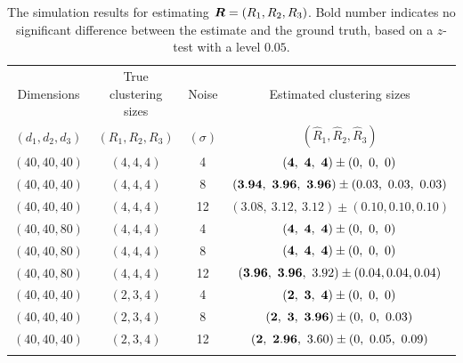 \documentclass{article}
\begin{document}
\begin{appendices}
\begin{table}[http]
	\begin{tabular}{c|c|c|c}
		\hline
		Dimensions &True clustering sizes&Noise&Estimated clustering sizes\\ 
$(d_1,d_2,d_3)$&$(R_1,R_2,R_3)$&$(\sigma)$&$(\hat R_1,\hat R_2,\hat R_3)$\\
		\hline
		$(40,40,40)$&$(4,4,4)$&4&$({\bf 4},\ {\bf 4},\ {\bf 4})\pm (0,\ 0,\ 0)$\\
		$(40,40,40)$&$(4,4,4)$&8&$({\bf 3.94},\ {\bf 3.96},\ {\bf 3.96})\pm (0.03,\ 0.03,\ 0.03)$\\
		$(40,40,40)$&$(4,4,4)$&12&$(3.08,\ 3.12,\ 3.12)\pm (0.10,0.10,0.10)$\\
		\hline
		$(40,40,80)$&$(4,4,4)$&4&$({\bf 4},\ {\bf 4},\ {\bf 4})\pm (0,\ 0,\ 0)$\\
		$(40,40,80)$&$(4,4,4)$&8&$({\bf 4},\ {\bf 4},\ {\bf 4})\pm (0,\ 0,\ 0)$\\
		$(40,40,80)$&$(4,4,4)$&12&$({\bf 3.96},\ {\bf 3.96},\ 3.92)\pm (0.04,0.04,0.04)$\\
			\hline
		$(40,40,40)$&$(2,3,4)$&4&$({\bf 2},\ {\bf 3},\ {\bf 4})\pm (0,\ 0,\ 0)$\\
		$(40,40,40)$&$(2,3,4)$&8&$({\bf 2},{\bf \ 3},\ {\bf 3.96})\pm (0,\ 0,\ 0.03)$ \\
		$(40,40,40)$&$(2,3,4)$&12&$({\bf 2},\ {\bf 2.96},\ 3.60)\pm (0,\ 0.05,\ 0.09)$\\
\vspace{.1cm}
	\end{tabular}
		\caption{The simulation results for estimating $\bm{R}=(R_1,R_2,R_3)$. Bold number indicates no significant difference between the estimate and the ground truth, based on a $z$-test with a level $0.05$.}\label{tab:rank}
\end{table}


\end{appendices}
\end{document}
